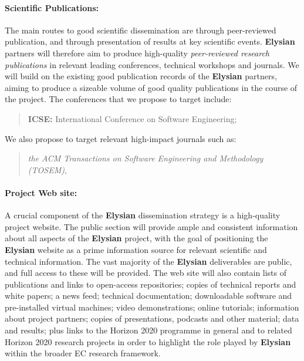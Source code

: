 \documentclass[a4paper,11pt]{article}
\newcommand{\project}[1]{\textbf{#1}\xspace}
\newcommand{\SECURITY}{\project{Elysian}}
\newcommand{\TheProject}{\SECURITY}
\begin{document}
\paragraph{Scientific Publications:}  The main routes to good scientific dissemination are
through peer-reviewed publication, and through presentation of results at key scientific events.
\TheProject{} partners will therefore aim to produce high-quality \emph{peer-reviewed
research publications} in relevant leading
conferences, technical workshops and journals.
We will build on the existing good publication records of the \TheProject{} partners,
aiming to produce a sizeable volume of good quality publications in the course of the project. 
%
\noindent
The conferences that we propose to target include:

\begin{quote}
\textbf{ICSE:} International Conference on Software Engineering;
 \end{quote}

\noindent
We also propose to target relevant high-impact journals such as:
\begin{quote}
\emph{the ACM Transactions on Software Engineering and Methodology (TOSEM)}, 
\end{quote}

\paragraph{Project Web site:}  
A crucial component of the \TheProject{} dissemination strategy is a
high-quality project website. The public section will provide ample
and consistent information about all aspects of the \TheProject{}
project, with the goal of positioning the \TheProject{} website as a
prime information source for relevant scientific and technical
information.  The vast majority of the \TheProject{} deliverables are
public, and full access to these will be provided.  The web site will also contain lists of publications and links
to open-access repositories; copies of technical reports and white
papers; a news feed; technical documentation; downloadable software
and pre-installed virtual machines; video demonstrations; online
tutorials; information about project partners; copies of
presentations, podcasts and other material; data and results; plus
links to the Horizon 2020 programme in general and to related 
Horizon 2020 research projects in order to highlight the role played by \TheProject{} within the
broader EC research framework.
\end{document}
